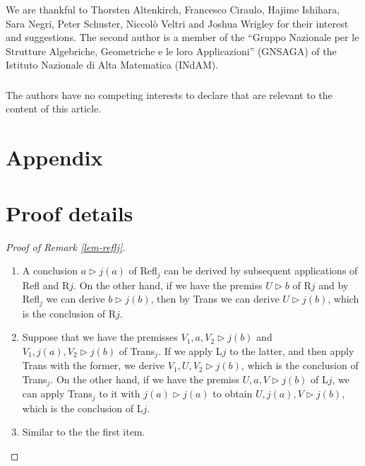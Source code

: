 \documentclass[runningheads]{llncs}
\begin{document}
\begin{credits}
\subsubsection{\ackname} We are thankful to Thorsten Altenkirch, Francesco Ciraulo, Hajime Ishihara, Sara Negri, Peter Schuster, Niccolò Veltri and Joshua Wrigley for their interest and suggestions.
The second author is a member of the ``Gruppo Nazionale per le Strutture Algebriche, Geometriche e le loro Applicazioni''  (GNSAGA) of the Istituto Nazionale di Alta Matematica (INdAM).

\subsubsection{\discintname}
The authors have no competing interests to declare that are relevant to the content of this article.
\end{credits}
%
%
%


%

\vfill
\pagebreak
\appendix

\section*{Appendix}

\section{Proof details}
\label{sec-details}

\begin{proof}[Proof of Remark \ref{lem-reflj}]\
    \begin{enumerate}
        \item 
        A conclusion $a\rhd j(a)$ of Refl$_j$ can be derived by subsequent applications of Refl and R$j$.
        On the other hand, if we have the premiss $U\rhd b$ of R$j$ and by Refl$_j$ we can derive $b\rhd j(b)$, then by Trans we can derive $U\rhd j(b)$, which is the conclusion of R$j$.
        \item 
        Suppose that we have the premisses $V_1,a,V_2\rhd j(b)$ and $V_1,j(a),V_2\rhd j(b)$ of Trans$_j$. If we apply L$j$ to the latter, and then apply Trans with the former, we derive $V_1,U,V_2\rhd j(b)$, which is the conclusion of Trans$_j$.
        On the other hand, if we have the premiss $U,a,V\rhd j(b)$ of L$j$, we can apply Trans$_j$ to it with $j(a)\rhd j(a)$ to obtain $U,j(a),V\rhd j(b)$, which is the conclusion of L$j$.
        \item 
        Similar to the the first item.
        \qedhere
    \end{enumerate}
\end{proof}
\end{document}
